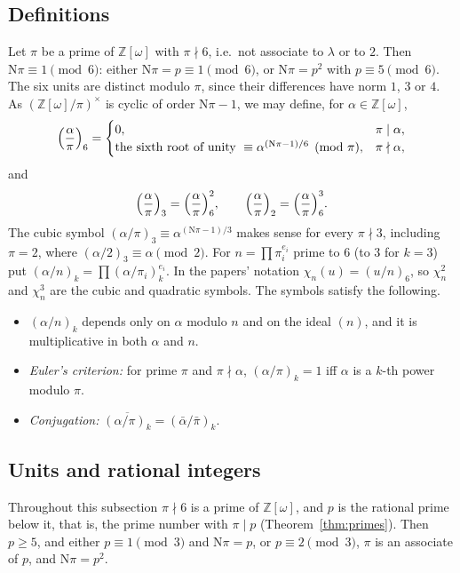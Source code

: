 \documentclass[11pt]{article}
\numberwithin{equation}{section}
\newcommand{\N}{\mathrm N}
\newcommand{\OO}{\mathbb Z[\omega]}
\theoremstyle{definition}
\theoremstyle{remark}
\begin{document}
\subsection{Definitions}
Let $\pi$ be a prime of $\OO$ with $\pi\nmid6$, i.e.\ not associate to $\lambda$ or to $2$.
Then $\N\pi\equiv1\pmod 6$: either $\N\pi=p\equiv1\pmod 6$, or $\N\pi=p^2$ with $p\equiv5\pmod6$.
The six units are distinct modulo $\pi$, since their differences have norm $1$, $3$ or $4$. As
$(\OO/\pi)^\times$ is cyclic of order $\N\pi-1$, we may define, for $\alpha\in\OO$,
\begin{equation}\label{eq:sexticdef}
 \Bigl(\frac\alpha\pi\Bigr)_6=\begin{cases}0,&\pi\mid\alpha,\\
 \text{the sixth root of unity }\equiv\alpha^{(\N\pi-1)/6}\pmod\pi,&\pi\nmid\alpha,\end{cases}
\end{equation}
and
\begin{equation}\label{eq:cubicquad}
 \Bigl(\frac\alpha\pi\Bigr)_3=\Bigl(\frac\alpha\pi\Bigr)_6^2,\qquad
 \Bigl(\frac\alpha\pi\Bigr)_2=\Bigl(\frac\alpha\pi\Bigr)_6^3 .
\end{equation}
The cubic symbol $(\alpha/\pi)_3\equiv\alpha^{(\N\pi-1)/3}$ makes sense for every $\pi\nmid3$,
including $\pi=2$, where $(\alpha/2)_3\equiv\alpha\pmod 2$. For $n=\prod\pi_i^{e_i}$ prime to $6$ (to
$3$ for $k=3$) put $(\alpha/n)_k=\prod(\alpha/\pi_i)_k^{e_i}$. In the papers' notation
$\chi_n(u)=(u/n)_6$, so $\chi_n^2$ and $\chi_n^3$ are the cubic and quadratic symbols. The
symbols satisfy the following.
\begin{itemize}
\item $(\alpha/n)_k$ depends only on $\alpha$ modulo $n$ and on the ideal $(n)$, and it is
multiplicative in both $\alpha$ and $n$.
\item \emph{Euler's criterion:} for prime $\pi$ and $\pi\nmid\alpha$, $(\alpha/\pi)_k=1$ iff $\alpha$ is a $k$-th power modulo $\pi$.
\item \emph{Conjugation:} $\overline{(\alpha/\pi)_k}=(\bar\alpha/\bar\pi)_k$.
\end{itemize}

\subsection{Units and rational integers}\label{sec:rational}
Throughout this subsection $\pi\nmid6$ is a prime of $\OO$, and $p$ is the rational prime below it,
that is, the prime number with $\pi\mid p$ (Theorem~\ref{thm:primes}). Then $p\ge5$, and either
$p\equiv1\pmod3$ and $\N\pi=p$, or $p\equiv2\pmod3$, $\pi$ is an associate of $p$, and $\N\pi=p^2$.
\end{document}
